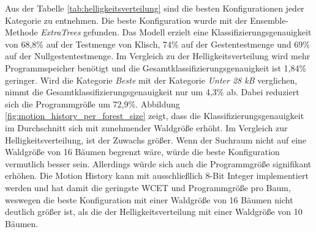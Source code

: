 \newline
\newline
Aus der Tabelle \ref{tab:helligkeitsverteilung} sind die besten Konfigurationen jeder Kategorie zu entnehmen. Die beste Konfiguration wurde mit der Ensemble-Methode \textit{ExtraTrees} gefunden.
Das Modell erzielt eine Klassifizierungsgenauigkeit von 68,8\% auf der Testmenge von Klisch, 74\% auf der Gestentestmenge und 69\% auf der Nullgestentestmenge. Im Vergleich zu der Helligkeitsverteilung
wird mehr Programmspeicher benötigt und die Gesamtklassifizierungsgenauigkeit ist 1,84\% geringer.
\newline
\newline
Wird die Kategorie \textit{Beste} mit der Kategorie \textit{Unter 28 kB} verglichen, nimmt die Gesamtklassifizierungsgenauigkeit nur um 4,3\% ab. Dabei reduziert sich die Programmgröße um 72,9\%.
Abbildung \ref{fig:motion_history_per_forest_size} zeigt, dass die Klassifizierungsgenauigkeit im Durchschnitt sich mit zunehmender Waldgröße erhöht. Im Vergleich zur Helligkeitsverteilung, ist der Zuwachs größer.
Wenn der Suchraum nicht auf eine Waldgröße von 16 Bäumen begrenzt wäre, würde die beste Konfiguration vermutlich besser sein. Allerdings würde sich auch die Programmgröße signifikant erhöhen.
\newline
\newline
Die Motion History kann mit ausschließlich 8-Bit Integer implementiert werden und hat damit die geringste WCET und Programmgröße pro Baum, weswegen die beste Konfiguration mit einer Waldgröße von 16 Bäumen nicht deutlich
größer ist, als die der Helligkeitsverteilung mit einer Waldgröße von 10 Bäumen.
